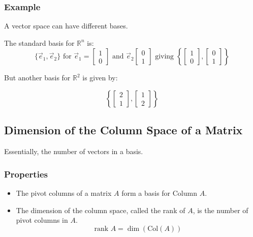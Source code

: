         \subsubsection{Example}
        A vector space can have different bases.

        The standard basis for $\mathbb{R}^n$ is:
        \[
        \{\vec{e}_1, \vec{e}_2\} \text{ for } \vec{e}_1 =
        \left[ \begin{array}{c}
        1\\
        0
        \end{array}\right] \text{ and } \vec{e}_2
        \left[ \begin{array}{c}
        0\\
        1
        \end{array}\right] \text{ giving }
        \left\{ \left[ \begin{array}{c}
        1\\
        0
        \end{array}\right],
        \left[ \begin{array}{c}
        0\\
        1
        \end{array}\right]\right\}
        \]

        But another basis for $\mathbb{R}^2$ is given by:

        \[
        \left\{ \left[ \begin{array}{c}
        2\\
        1
        \end{array}\right],
        \left[ \begin{array}{c}
        1\\
        2
        \end{array}\right]\right\}
        \]
    \subsection{Dimension of the Column Space of a Matrix}
    Essentially, the number of vectors in a basis.

        \subsubsection{Properties}
        \begin{itemize}
            \item The pivot columns of a matrix $A$ form a basis for Column $A$.
            \item The dimension of the column space, called the rank of $A$, is the number of pivot columns in $A$.
                \[
                    \text{rank } A = \dim(\text{Col}(A))
                \]
        \end{itemize}

